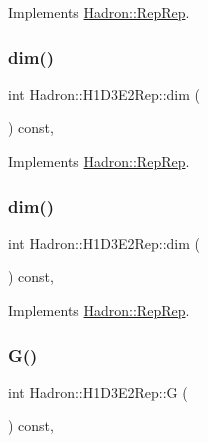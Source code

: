 Implements \mbox{\hyperlink{structHadron_1_1RepRep_a92c8802e5ed7afd7da43ccfd5b7cd92b}{Hadron\+::\+Rep\+Rep}}.

\mbox{\label{structHadron_1_1H1D3E2Rep_ac3d25d7b7ce1156c787d549f631689e8}} 
\subsubsection{\texorpdfstring{dim()}{dim()}\hspace{0.1cm}{\footnotesize\ttfamily [2/3]}}
{\footnotesize\ttfamily int Hadron\+::\+H1\+D3\+E2\+Rep\+::dim (\begin{DoxyParamCaption}{ }\end{DoxyParamCaption}) const\hspace{0.3cm}{\ttfamily [inline]}, {\ttfamily [virtual]}}



Implements \mbox{\hyperlink{structHadron_1_1RepRep_a92c8802e5ed7afd7da43ccfd5b7cd92b}{Hadron\+::\+Rep\+Rep}}.

\mbox{\label{structHadron_1_1H1D3E2Rep_ac3d25d7b7ce1156c787d549f631689e8}} 
\subsubsection{\texorpdfstring{dim()}{dim()}\hspace{0.1cm}{\footnotesize\ttfamily [3/3]}}
{\footnotesize\ttfamily int Hadron\+::\+H1\+D3\+E2\+Rep\+::dim (\begin{DoxyParamCaption}{ }\end{DoxyParamCaption}) const\hspace{0.3cm}{\ttfamily [inline]}, {\ttfamily [virtual]}}



Implements \mbox{\hyperlink{structHadron_1_1RepRep_a92c8802e5ed7afd7da43ccfd5b7cd92b}{Hadron\+::\+Rep\+Rep}}.

\mbox{\label{structHadron_1_1H1D3E2Rep_a88ee6e489859f4eada7e37ac4333c6fd}} 
\subsubsection{\texorpdfstring{G()}{G()}\hspace{0.1cm}{\footnotesize\ttfamily [1/2]}}
{\footnotesize\ttfamily int Hadron\+::\+H1\+D3\+E2\+Rep\+::G (\begin{DoxyParamCaption}{ }\end{DoxyParamCaption}) const\hspace{0.3cm}{\ttfamily [inline]}, {\ttfamily [virtual]}}

